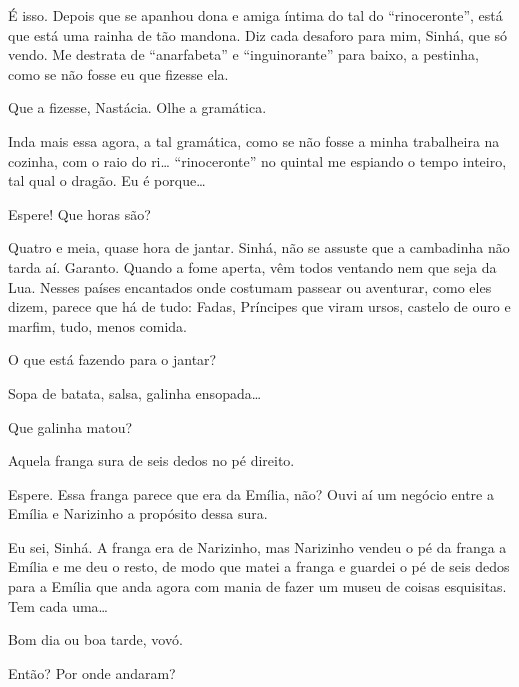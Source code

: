  É isso. Depois que se apanhou dona e amiga íntima do
tal do ``rinoceronte'', está que está uma rainha de tão mandona. Diz
cada desaforo para mim, Sinhá, que só vendo. Me destrata de
``anarfabeta'' e ``inguinorante'' para baixo, a pestinha, como se não
fosse eu que fizesse ela.

 Que a fizesse, Nastácia. Olhe a gramática.

  Inda mais essa agora, a tal
gramática, como se não fosse a minha trabalheira na cozinha, com o raio
do ri\ldots{} ``rinoceronte'' no quintal me espiando o tempo inteiro,
tal qual o dragão. Eu é porque\ldots{}

 Espere! Que horas são?

  Quatro e meia, quase hora de jantar.
Sinhá, não se assuste que a cambadinha não tarda aí. Garanto. Quando a
fome aperta, vêm todos ventando nem que seja da Lua. Nesses países
encantados onde costumam passear ou aventurar, como eles dizem, parece
que há de tudo: Fadas, Príncipes que viram ursos, castelo de ouro e
marfim, tudo, menos comida.

 O que está fazendo para o jantar?

 Sopa de batata, salsa, galinha ensopada\ldots{}

 Que galinha matou?

 Aquela franga sura de seis dedos no pé direito.

  Espere. Essa franga parece que era
da Emília, não? Ouvi aí um negócio entre a Emília e Narizinho a
propósito dessa sura.

 Eu sei, Sinhá. A franga era de Narizinho, mas Narizinho
vendeu o pé da franga a Emília e me deu o resto, de modo que matei a
franga e guardei o pé de seis dedos para a Emília que anda agora com
mania de fazer um museu de coisas esquisitas. Tem cada uma\ldots{}


 Bom dia ou boa tarde, vovó. 

 Então? Por onde andaram?

